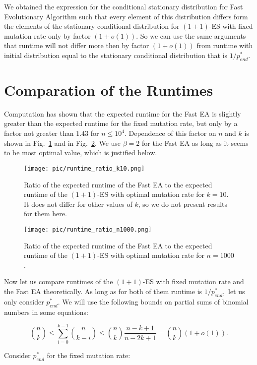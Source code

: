 \documentclass{article}
\begin{document}
We obtained the expression for the conditional stationary distribution for Fast Evolutionary Algorithm such that every element of this distribution differs form the elements of the stationary conditional distribution for $(1+1)$-ES with fixed mutation rate only by factor $(1 + o(1)).$ So we can use the same arguments that runtime will not differ more then by factor $(1 + o(1))$ from runtime with initial distribution equal to the stationary conditional distribution that is $1 / p_{end}^*$.

\section{Comparation of the Runtimes}

Computation has shown that the expected runtime for the Fast EA is slightly greater than the expected runtime for the fixed mutation rate, but only by a factor not greater than $1.43$ for $n \le 10^4$. Dependence of this factor on $n$ and $k$ is shown in Fig.~\ref{runtimes_over_n} and in Fig.~\ref{runtimes_over_k}. We use $\beta = 2$ for the Fast EA as long as it seems to be most optimal value, which is justified below.

\begin{figure}
  \texttt{[image: pic/runtime\_ratio\_k10.png]}
  \caption{Ratio of the expected runtime of the Fast EA to the expected runtime of the $(1 + 1)$-ES with optimal mutation rate for $k = 10$. It does not differ for other values of $k$, so we do not present results for them here.}\label{runtimes_over_n}
\end{figure}


\begin{figure}
  \texttt{[image: pic/runtime\_ratio\_n1000.png]}
  \caption{Ratio of the expected runtime of the Fast EA to the expected runtime of the $(1 + 1)$-ES with optimal mutation rate for $n = 1000$.}\label{runtimes_over_k}
\end{figure}

Now let us compare runtimes of the $(1 + 1)$-ES with fixed mutation rate and the Fast EA theoretically. As long as for both of them runtime is $1/p_{end}^*,$ let us only consider $p_{end}^*.$ We will use the following bounds on partial sums of binomial numbers in some equations:

$$\binom{n}{k} \le \sum\limits_{i = 0}^{k - 1} \binom{n}{k - i} \le \binom{n}{k} \frac{n - k + 1}{n - 2k + 1} = \binom{n}{k}(1 + o(1)).$$


Consider $p_{end}^*$ for the fixed mutation rate:
\end{document}

